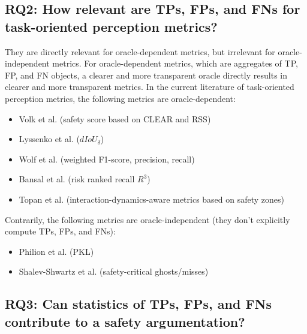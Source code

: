 \documentclass[conference]{IEEEtran}
\begin{document}





\subsection{RQ2: How relevant are TPs, FPs, and FNs for task-oriented perception metrics?}
\label{sec:discussion_rq2}

They are directly relevant for oracle-dependent metrics, but irrelevant for oracle-independent metrics.
For oracle-dependent metrics, which are aggregates of TP, FP, and FN objects, a clearer and more transparent oracle directly results in clearer and more transparent metrics. 
In the current literature of task-oriented perception metrics, the following metrics are oracle-dependent:
\begin{itemize}
	\item Volk et al. (safety score based on CLEAR and RSS) \cite{Volk2020metric}
	\item Lyssenko et al. ($dIoU_\delta$) \cite{Lyssenko2021relevance}
	\item Wolf et al. (weighted F1-score, precision, recall) \cite{Wolf2021people}
	\item Bansal et al. (risk ranked recall $R^3$) \cite{Bansal2021riskrankedrecall}
	\item Topan et al. (interaction-dynamics-aware metrics based on safety zones) \cite{Topan2022zones}
\end{itemize}
Contrarily, the following metrics are oracle-independent (they don't explicitly compute TPs, FPs, and FNs): %
\begin{itemize}
	\item Philion et al. (PKL) \cite{Philion2020planner_centric}
	\item Shalev-Shwartz et al. (safety-critical ghosts/misses) \cite{shalevshwartz2017formalRSS}
\end{itemize}

\subsection{RQ3: Can statistics of TPs, FPs, and FNs contribute to a safety argumentation?}
\label{sec:discussion_rq3}
\end{document}
